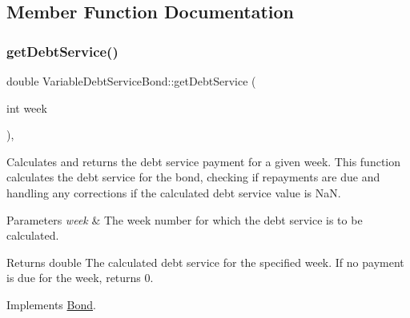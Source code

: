 \subsection{Member Function Documentation}
\mbox{\label{classVariableDebtServiceBond_a575a9a41df38e005ba0a1cff3eb2b921}} 
\subsubsection{\texorpdfstring{get\+Debt\+Service()}{getDebtService()}}
{\footnotesize\ttfamily double Variable\+Debt\+Service\+Bond\+::get\+Debt\+Service (\begin{DoxyParamCaption}\item[{int}]{week }\end{DoxyParamCaption})\hspace{0.3cm}{\ttfamily [override]}, {\ttfamily [virtual]}}



Calculates and returns the debt service payment for a given week. This function calculates the debt service for the bond, checking if repayments are due and handling any corrections if the calculated debt service value is NaN. 


\begin{DoxyParams}{Parameters}
{\em week} & The week number for which the debt service is to be calculated.\\
\hline
\end{DoxyParams}
\begin{DoxyReturn}{Returns}
double The calculated debt service for the specified week. If no payment is due for the week, returns 0. 
\end{DoxyReturn}


Implements \mbox{\hyperlink{classBond_a98d8ecaf4b36319674ebd220598996bc}{Bond}}.

\mbox{\label{classVariableDebtServiceBond_a8cc7ee442d788b91b8c00e6bed07644d}} 
